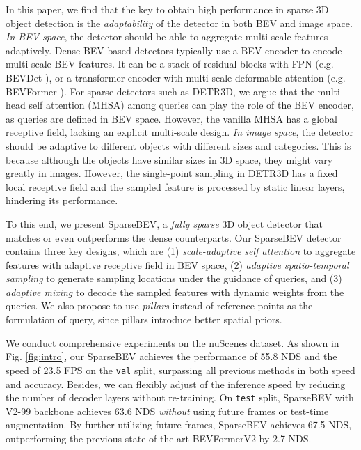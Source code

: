 \documentclass[10pt,twocolumn,letterpaper]{article}
\begin{document}
In this paper, we find that the key to obtain high performance in sparse 3D object detection is the \textit{adaptability} of the detector in both BEV and image space.
\textit{In BEV space}, the detector should be able to aggregate multi-scale features adaptively.
Dense BEV-based detectors typically use a BEV encoder to encode multi-scale BEV features. It can be a stack of residual blocks with FPN \cite{fpn} (e.g. BEVDet \cite{fpn}), or a transformer encoder with multi-scale deformable attention \cite{deformabledetr} (e.g. BEVFormer \cite{bevformer}).
For sparse detectors such as DETR3D, we argue that the multi-head self attention (MHSA) \cite{transformer} among queries can play the role of the BEV encoder, as queries are defined in BEV space.
However, the vanilla MHSA has a global receptive field, lacking an explicit multi-scale design.
\textit{In image space}, the detector should be adaptive to different objects with different sizes and categories.
This is because although the objects have similar sizes in 3D space, they might vary greatly in images.
However, the single-point sampling in DETR3D has a fixed local receptive field and the sampled feature is processed by static linear layers, hindering its performance.

To this end, we present SparseBEV, a \textit{fully sparse} 3D object detector that matches or even outperforms the dense counterparts.
Our SparseBEV detector contains three key designs, which are (1) \textit{scale-adaptive self attention} to aggregate features with adaptive receptive field in BEV space, (2) \textit{adaptive spatio-temporal sampling} to generate sampling locations under the guidance of queries, and (3) \textit{adaptive mixing} to decode the sampled features with dynamic weights from the queries.
We also propose to use \textit{pillars} instead of reference points as the formulation of query, since pillars introduce better spatial priors.

We conduct comprehensive experiments on the nuScenes dataset. As shown in Fig. \ref{fig:intro}, our SparseBEV achieves the performance of 55.8 NDS and the speed of 23.5 FPS on the \texttt{val} split, surpassing all previous methods in both speed and accuracy. Besides, we can flexibly adjust of the inference speed by reducing the number of decoder layers without re-training. On \texttt{test} split, SparseBEV with V2-99 \cite{vovnet2} backbone achieves 63.6 NDS \textit{without} using future frames or test-time augmentation. By further utilizing future frames, SparseBEV achieves 67.5 NDS, outperforming the previous state-of-the-art BEVFormerV2 \cite{bevformerv2} by 2.7 NDS.
\end{document}
